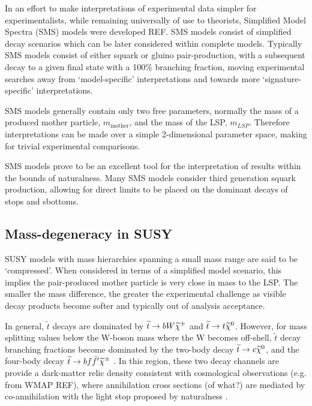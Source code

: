 In an effort to make interpretations of experimental data simpler for
experimentalists, while remaining universally of use to theorists,
Simplified Model Spectra (SMS) models were developed REF. SMS models consist of
simplified
decay scenarios which can be later considered within complete models.
Typically SMS models consist of either squark or gluino pair-production, with a
subsequent decay to a given final state with a 100\% branching fraction,
moving
experimental searches away from `model-specific' interpretations and
towards more `signature-specific' interpretations.

SMS models generally contain only two free parameters, normally the mass of a
produced mother particle, $m_{\text{mother}}$, and the mass of the LSP,
$m_{LSP}$. Therefore interpretations can be made over a simple 2-dimensional
parameter space, making for trivial experimental comparisons.


SMS models prove to be an excellent tool for the interpretation of results
within the bounds of naturalness. Many SMS models consider third generation
squark production, allowing for direct limits to be placed on the dominant
decays of stops and sbottoms.

\subsection{Mass-degeneracy in SUSY}
SUSY models with mass hierarchies spanning a small mass range are said to be
`compressed'. When considered in terms of a simplified model scenario, this
implies the pair-produced mother particle is very close in mass to the LSP. The
smaller the mass difference, the greater the experimental challenge as visible
decay products become softer and typically out of analysis acceptance.

In general, $\tilde{t}$ decays are dominated by $\widetilde{t}\rightarrow bW\widetilde{\chi}^{\pm}$ and
$\widetilde{t}\rightarrow t\widetilde{\chi}^{0}$. However, for mass splitting values below the W-boson
mass where the W becomes off-shell, $\tilde{t}$ decay branching fractions become
dominated by the two-body decay $\widetilde{t}\rightarrow c\widetilde{\chi}^{0}$, and the four-body decay
$\widetilde{t}\rightarrow bf\bar{f}'\widetilde{\chi}^{\pm}$ \cite{Boehm:1999tr}. In this region, these two decay
channels are provide a dark-matter relic density consistent with cosmological
observations (e.g. from WMAP REF), where annihilation cross sections (of what?)
are mediated by co-annihilation with the light stop proposed by naturalness
\cite{Balazs:2004bu}.

